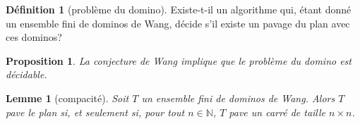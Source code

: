\documentclass{scrartcl}
\newcommand{\N}{\mathbb N}
\newtheorem{lemme}{Lemme}
\newtheorem{proposition}{Proposition}
\theoremstyle{definition}
\newtheorem*{definition}{Définition}
\theoremstyle{remark}
\begin{document}
\begin{definition}[problème du domino]
  Existe-t-il un algorithme qui, étant donné un ensemble fini de dominos de Wang, décide s'il existe un pavage du plan avec ces dominos?
\end{definition}

\begin{proposition}
  La conjecture de Wang implique que le problème du domino est décidable.
\end{proposition}

\begin{lemme}[compacité]
  Soit $T$ un ensemble fini de dominos de Wang. Alors $T$ pave le plan si, et seulement si, pour tout $n\in\N$, $T$ pave un carré de taille $n\times n$.
\end{lemme}
\end{document}
